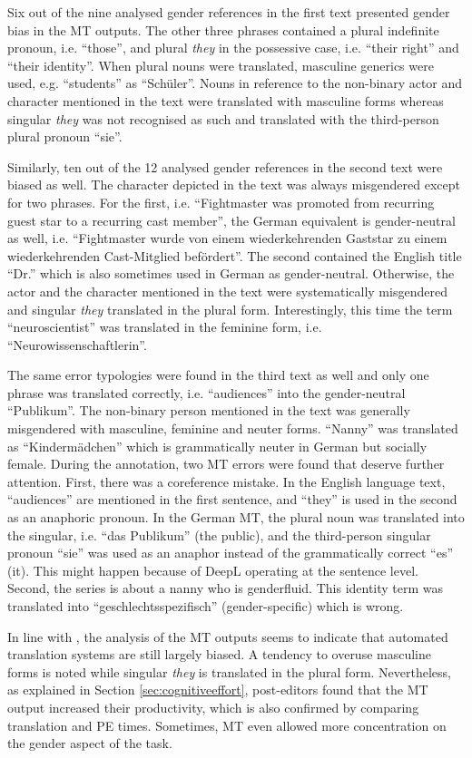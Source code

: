 Six out of the nine analysed gender references in the first text presented gender bias in the MT outputs. The other three phrases contained a plural indefinite pronoun, i.e. ``those'', and plural \textit{they} in the possessive case, i.e. ``their right'' and ``their identity''. When plural nouns were translated, masculine generics were used, e.g. ``students'' as ``Schüler''. Nouns in reference to the non-binary actor and character mentioned in the text were translated with masculine forms whereas singular \textit{they} was not recognised as such and translated with the third-person plural pronoun ``sie''.

Similarly, ten out of the 12 analysed gender references in the second text were biased as well. The character depicted in the text was always misgendered except for two phrases. For the first, i.e. ``Fightmaster was promoted from recurring guest star to a recurring cast member'', the German equivalent is gender-neutral as well, i.e. ``Fightmaster wurde von einem wiederkehrenden Gaststar zu einem wiederkehrenden Cast-Mitglied befördert''. The second contained the English title ``Dr.'' which is also sometimes used in German as gender-neutral. Otherwise, the actor and the character mentioned in the text were systematically misgendered and singular \textit{they} translated in the plural form. Interestingly, this time the term ``neuroscientist'' was translated in the feminine form, i.e. ``Neurowissenschaftlerin''. 

The same error typologies were found in the third text as well and only one phrase was translated correctly, i.e. ``audiences'' into the gender-neutral ``Publikum''.  The non-binary person mentioned in the text was generally misgendered with masculine, feminine and neuter forms. ``Nanny'' was translated as ``Kindermädchen'' which is grammatically neuter in German but socially female.  During the annotation, two MT errors were found that deserve further attention. First, there was a coreference mistake. In the English language text, “audiences” are mentioned in the first sentence, and “they” is used in the second as an anaphoric pronoun. In the German MT, the plural noun was translated into the singular, i.e. “das Publikum” (the public), and the third-person singular pronoun “sie” was used as an anaphor instead of the grammatically correct “es” (it). This might happen because of DeepL operating at the sentence level. Second, the series is about a nanny who is genderfluid. This identity term was translated into “geschlechtsspezifisch” (gender-specific) which is wrong.

In line with \textcite{prates2019assessing,piazzollagood,lardelli-etal-2024-building}, the analysis of the MT outputs seems to indicate that automated translation systems are still largely biased. A tendency to overuse masculine forms is noted while singular \textit{they} is translated in the plural form. Nevertheless, as explained in Section \ref{sec:cognitiveeffort}, post-editors found that the MT output increased their productivity, which is also confirmed by comparing translation and PE times. Sometimes, MT even allowed more concentration on the gender aspect of the task.
